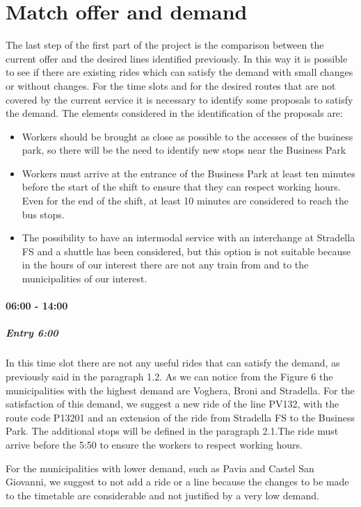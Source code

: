 \section{Match offer and demand}

The last step of the first part of the project is the comparison between the current offer and the desired lines identified previously. In this way it is possible to see if there are existing rides which can satisfy the demand with small changes or without changes. For the time slots and for the desired routes that are not covered by the current service it is necessary to identify some proposals to satisfy the demand.
The elements considered in the identification of the proposals are:
\begin{itemize}
    \item Workers should be brought as close as possible to the accesses of the business park, so there will be the need to identify new stops near the Business Park
    \item Workers must arrive at the entrance of the Business Park at least ten minutes before the start of the shift to ensure that they can respect working hours. Even for the end of the shift, at least 10 minutes are considered to reach the bus stops.
    \item The possibility to have an intermodal service with an interchange at Stradella FS and a shuttle has been considered, but this option is not suitable because in the hours of our interest there are not any train from and to the municipalities of our interest.
\end{itemize}

\paragraph{06:00 - 14:00}

\subparagraph{Entry 6:00} In this time slot there are not any useful rides that can satisfy the demand, as previously said in the paragraph 1.2. As we can notice from the Figure 6 the municipalities with the highest demand are Voghera, Broni and Stradella. For the satisfaction of this demand, we suggest a new ride of the line PV132, with the route code P13201 and an extension of the ride from Stradella FS to the Business Park. The additional stops will be defined in the paragraph 2.1.The ride must arrive before the 5:50 to ensure the workers to respect working hours.

For the municipalities with lower demand, such as Pavia and Castel San Giovanni, we suggest to not add a ride or a line because the changes to be made to the timetable are considerable and not justified by a very low demand.

